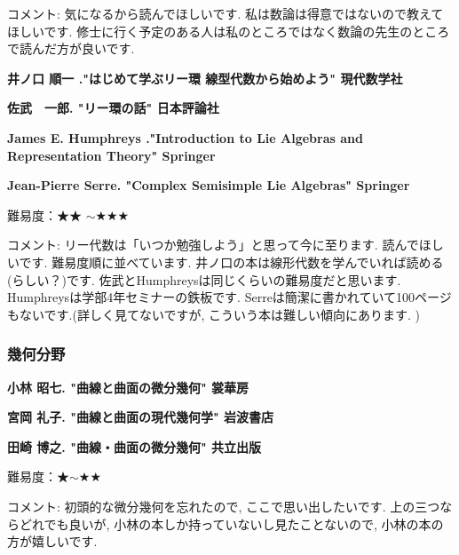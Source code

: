 コメント: 気になるから読んでほしいです. 私は数論は得意ではないので教えてほしいです. 
修士に行く予定のある人は私のところではなく数論の先生のところで読んだ方が良いです. 
\vspace{8pt}

\textbf{井ノ口 順一 ."はじめて学ぶリー環 線型代数から始めよう" 現代数学社} \vspace{-6pt} 

\textbf{佐武　一郎. "リー環の話" 日本評論社} \vspace{-6pt} 

\textbf{James E. Humphreys ."Introduction to Lie Algebras and Representation Theory" Springer} \vspace{-6pt} 

\textbf{Jean-Pierre Serre. "Complex Semisimple Lie Algebras" Springer}  　\vspace{-6pt} 

難易度：★★ $\sim$★★★\vspace{-6pt} 

コメント: リー代数は「いつか勉強しよう」と思って今に至ります. 読んでほしいです. 
難易度順に並べています. 井ノ口の本は線形代数を学んでいれば読める(らしい？)です. 佐武とHumphreysは同じくらいの難易度だと思います. Humphreysは学部4年セミナーの鉄板です. Serreは簡潔に書かれていて100ページもないです.(詳しく見てないですが, こういう本は難しい傾向にあります. ) 
\vspace{8pt}





\subsubsection{幾何分野}


\textbf{小林 昭七. "曲線と曲面の微分幾何" 裳華房}  　\vspace{-6pt} 

\textbf{宮岡 礼子. "曲線と曲面の現代幾何学" 岩波書店}  　\vspace{-6pt} 

\textbf{田崎 博之. "曲線・曲面の微分幾何" 共立出版}  　\vspace{-6pt} 

難易度：★$\sim$★★ 　\vspace{-6pt} 

コメント: 初頭的な微分幾何を忘れたので, ここで思い出したいです. 
上の三つならどれでも良いが, 小林の本しか持っていないし見たことないので, 小林の本の方が嬉しいです. 
\vspace{8pt}

